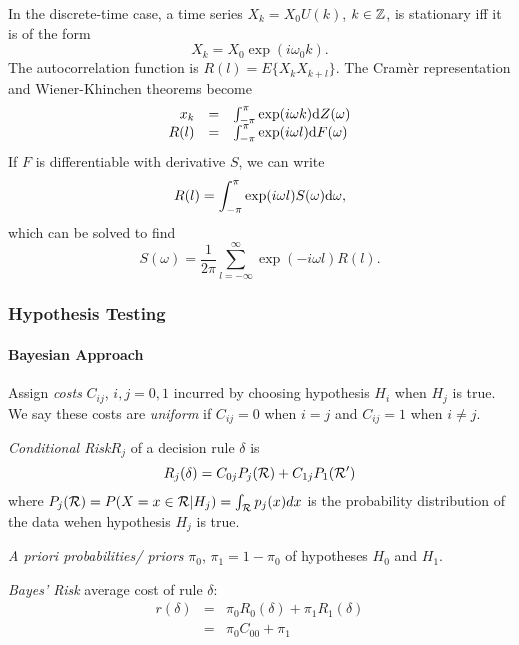 In the discrete-time case, a time series $X_k=X_0 U(k)$, $k \in \mathbb{Z}$, is stationary iff it is of the form
\begin{equation}
X_k = X_0 \exp(i \omega_0 k).
\end{equation}
The autocorrelation function is $R(l)=E\{X_k X_{k+l} \}$. The Cram\`er representation and Wiener-Khinchen theorems become 
\begin{equation}
\begin{array}{rcl}
x_k & = & \int_{-\pi}^{\pi} \exp(i\omega k ) {\mbox{d}} Z(\omega) \\
R(l) & = & \int_{-\pi}^{\pi} \exp(i\omega l ) {\mbox{d}} F(\omega) 
\end{array}
\end{equation}
If $F$ is differentiable with derivative $S$, we can write
\begin{equation}
R(l)=\int_{-\pi}^{\pi} \exp(i \omega l) S(\omega) {\mbox{d}} \omega,
\end{equation}
which can be solved to find 
\begin{equation}
S(\omega)=\frac{1}{2\pi}\sum_{l=-\infty}^{\infty} \exp(-i\omega l) R(l).
\end{equation}


\subsubsection{Hypothesis Testing}


\paragraph{Bayesian Approach}

Assign \textit{costs} $C_{ij}$, $i,j=0,1$ incurred by choosing hypothesis $H_i$ when $H_j$ is true. We say these costs are \textit{uniform} if $C_{ij}=0$ when $i=j$ and $C_{ij}=1$ when $i \neq j$. 

\textit{Conditional Risk}$R_j$ of a decision rule $\delta$ is 
\begin{equation}
\label{eq:conditionalrisk}
R_j(\delta)=C_{0j}P_j(\mathcal{R})+C_{1j}P_1(\mathcal{R}')
\end{equation}
where $P_j(\mathcal{R})=P(X=x\in \mathcal{R} | H_j)= \int_{\mathcal{R}} p_j(x)dx$ is the probability distribution of the data wehen hypothesis $H_j$ is true.

\textit{A priori probabilities/ priors} $\pi_0$, $\pi_1=1-\pi_0$ of hypotheses $H_0$ and $H_1$.

\textit{Bayes' Risk} average cost of rule $\delta$:
\begin{equation}
\label{eq:BayesRisk}
\begin{array}{rcl}
r(\delta)&=&\pi_0 R_0(\delta) + \pi_1 R_1(\delta)\\
&=& \pi_0 C_{00} + \pi_1 \\
\end{array}
\end{equation}

